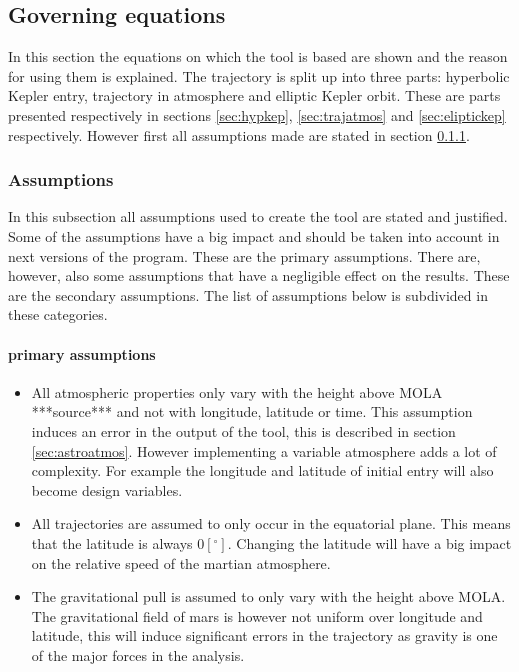 \subsection{Governing equations}
\label{sec:astrogov}
In this section the equations on which the tool is based are shown and the reason for using them is explained. The trajectory is split up into three parts: hyperbolic Kepler entry, trajectory in atmosphere and elliptic Kepler orbit. These are parts presented respectively in sections \ref{sec:hypkep}, \ref{sec:trajatmos} and \ref{sec:eliptickep} respectively. However first all assumptions made are stated in section \ref{sec:astroassumption}.

\subsubsection{Assumptions}
 \label{sec:astroassumption}
 In this subsection all assumptions used to create the tool are stated and justified. Some of the assumptions have a big impact and should be taken into account in next versions of the program. These are the primary assumptions. There are, however, also some assumptions that have a negligible effect on the results. These are the secondary assumptions. The list of assumptions below is subdivided in these categories.
 
 \paragraph{primary assumptions}
 \begin{itemize}
 \item All atmospheric properties only vary with the height above MOLA ***source*** and not with longitude, latitude or time. This assumption induces an error in the output of the tool, this is described in section \ref{sec:astroatmos}. However implementing a variable atmosphere adds a lot of complexity. For example the longitude and latitude of initial entry will also become design variables.
 \item All trajectories are assumed to only occur in the equatorial plane. This means that the latitude is always $0 \left[^\circ\right]$. Changing the latitude will have a big impact on the relative speed of the martian atmosphere.
 \item The gravitational pull is assumed to only vary with the height above MOLA. The gravitational field of mars is however not uniform over longitude and latitude, this will induce significant errors in the trajectory as gravity is one of the major forces in the analysis.
 \end{itemize}
 
